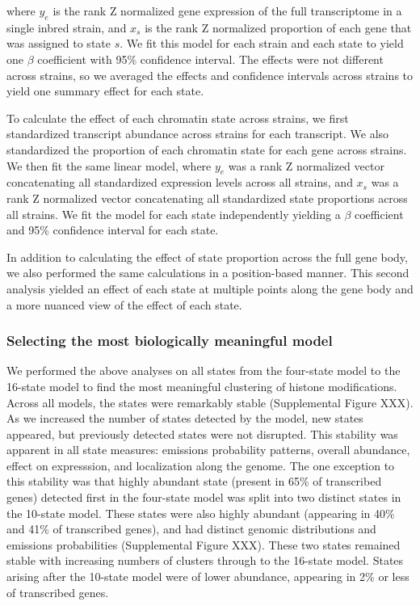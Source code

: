 \documentclass[10pt,letterpaper]{article}
\begin{document}
where \(y_{e}\) is the rank Z normalized gene expression of the full
transcriptome in a single inbred strain, and \(x_{s}\) is the rank Z
normalized proportion of each gene that was assigned to state \(s\). We
fit this model for each strain and each state to yield one \(\beta\)
coefficient with 95\% confidence interval. The effects were not
different across strains, so we averaged the effects and confidence
intervals across strains to yield one summary effect for each state.

To calculate the effect of each chromatin state across strains, we first
standardized transcript abundance across strains for each transcript. We
also standardized the proportion of each chromatin state for each gene
across strains. We then fit the same linear model, where \(y_{e}\) was a
rank Z normalized vector concatenating all standardized expression
levels across all strains, and \(x_{s}\) was a rank Z normalized vector
concatenating all standardized state proportions across all strains. We
fit the model for each state independently yielding a \(\beta\)
coefficient and 95\% confidence interval for each state.

In addition to calculating the effect of state proportion across the
full gene body, we also performed the same calculations in a
position-based manner. This second analysis yielded an effect of each
state at multiple points along the gene body and a more nuanced view of
the effect of each state.

\hypertarget{selecting-the-most-biologically-meaningful-model}{%
\subsubsection{Selecting the most biologically meaningful
model}\label{selecting-the-most-biologically-meaningful-model}}

We performed the above analyses on all states from the four-state model
to the 16-state model to find the most meaningful clustering of histone
modifications. Across all models, the states were remarkably stable
(Supplemental Figure XXX). As we increased the number of states detected
by the model, new states appeared, but previously detected states were
not disrupted. This stability was apparent in all state measures:
emissions probability patterns, overall abundance, effect on
expresssion, and localization along the genome. The one exception to
this stability was that highly abundant state (present in 65\% of
transcribed genes) detected first in the four-state model was split into
two distinct states in the 10-state model. These states were also highly
abundant (appearing in 40\% and 41\% of transcribed genes), and had
distinct genomic distributions and emissions probabilities (Supplemental
Figure XXX). These two states remained stable with increasing numbers of
clusters through to the 16-state model. States arising after the
10-state model were of lower abundance, appearing in 2\% or less of
transcribed genes.
\end{document}
